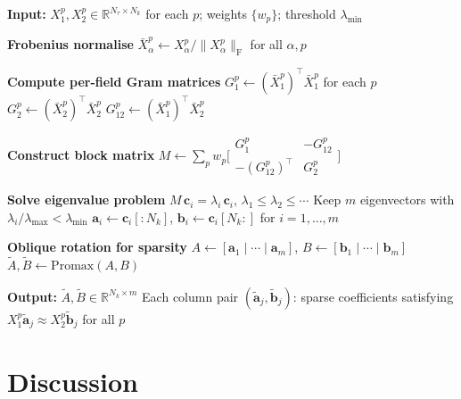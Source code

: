\documentclass[a4paper,11pt]{article}
\newcommand{\va}{\bm{a}}
\newcommand{\vb}{\bm{b}}
\newcommand{\vc}{\bm{c}}
\newcommand{\Xb}[2]{X_{#1}^{#2}}
\newcommand{\Xn}[2]{\bar{X}_{#1}^{#2}}
\newcommand{\Gb}[1]{G_{#1}}
\newcommand{\frob}[1]{\lVert #1 \rVert_{\mathrm{F}}}
\newcommand{\Nk}{N_k}
\newcommand{\Nt}{N_\tau}
\theoremstyle{plain}
\begin{document}
\begin{algorithm}[H]
\caption{Matching-solution sparse joint eigenfunction method}
\label{alg:pipeline}
\begin{algorithmic}[1]
\Statex \textbf{Input:} $\Xb{1}{p}, \Xb{2}{p} \in \mathbb{R}^{\Nt\times\Nk}$
        for each $p$; weights $\{w_p\}$; threshold $\lambda_{\min}$

\State \textbf{Frobenius normalise}
\State \quad $\Xn{\alpha}{p} \gets \Xb{\alpha}{p}/\frob{\Xb{\alpha}{p}}$
       for all $\alpha, p$

\State \textbf{Compute per-field Gram matrices} 
\State \quad $\Gb{1}^p \gets (\Xn{1}{p})^\top\Xn{1}{p}$ for each $p$
\State \quad $\Gb{2}^p \gets (\Xn{2}{p})^\top\Xn{2}{p}$
\State \quad $\Gb{12}^p \gets (\Xn{1}{p})^\top\Xn{2}{p}$

\State \textbf{Construct block matrix} 
\State \quad $M \gets \sum_p w_p
        \bigl[\begin{smallmatrix} \Gb{1}^p & -\Gb{12}^p \\
        -(\Gb{12}^p)^\top & \Gb{2}^p \end{smallmatrix}\bigr]$
       \Comment{$(2\Nk, 2\Nk)$}

\State \textbf{Solve eigenvalue problem} 
\State \quad $M\,\vc_i = \lambda_i\,\vc_i$, \quad
       $\lambda_1 \leq \lambda_2 \leq \cdots$
\State \quad Keep $m$ eigenvectors with $\lambda_i/\lambda_{\max} < \lambda_{\min}$
\State \quad $\va_i \gets \vc_i[:N_k]$, \quad
       $\vb_i \gets \vc_i[N_k:]$ for $i = 1,\ldots,m$

\State \textbf{Oblique rotation for sparsity} \Comment{\S\ref{sec:sparsity}}
\State \quad $A \gets [\va_1\mid\cdots\mid\va_m]$,\quad
       $B \gets [\vb_1\mid\cdots\mid\vb_m]$
\State \quad $\tilde{A}, \tilde{B} \gets \mathrm{Promax}(A, B)$

\Statex \textbf{Output:} $\tilde{A}, \tilde{B} \in \mathbb{R}^{\Nk\times m}$
\Statex \quad Each column pair $(\tilde{\va}_j, \tilde{\vb}_j)$: sparse coefficients
        satisfying $\Xb{1}{p}\tilde{\va}_j \approx \Xb{2}{p}\tilde{\vb}_j$
        for all $p$
\end{algorithmic}
\end{algorithm}

\section{Discussion}
\label{sec:discussion}
\end{document}

